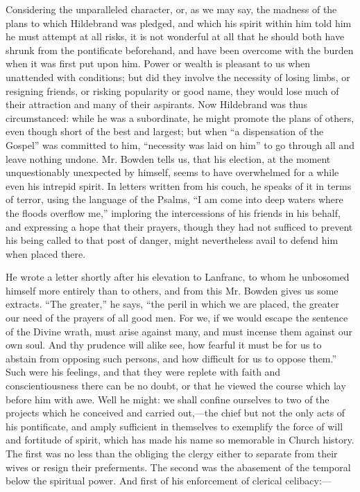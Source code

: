 Considering the unparalleled character, or, as we
may say, the madness of the plans to which Hildebrand was pledged, and
which his spirit within him told him he must attempt at all risks, it
is not wonderful at all that he should both have shrunk from the
pontificate beforehand, and have been overcome with the burden when it
was first put upon him. Power or wealth is pleasant to us when
unattended with conditions; but did they involve the necessity of
losing limbs, or resigning friends, or risking popularity or good
name, they would lose much of their attraction and many of their
aspirants. Now Hildebrand was thus circumstanced: while he was a
subordinate, he might promote the plans of others, even though short
of the best and largest; but when ``a dispensation of the Gospel'' was
committed to him, ``necessity was laid on him'' to go through all and
leave nothing undone. Mr. Bowden tells us, that his election, at
the moment unquestionably unexpected by himself, seems to have
overwhelmed for a while even his intrepid spirit. In letters written
from his couch, he speaks of it in terms of terror, using the language
of the Psalms, ``I am come into deep waters where the floods overflow
me,'' imploring the intercessions of his friends in his behalf, and
expressing a hope that their prayers, though they had not sufficed to
prevent his being called to that post of danger, might nevertheless
avail to defend him when placed there.

He wrote a letter shortly after his elevation to
Lanfranc, to whom he unbosomed himself more entirely than to others,
and from this Mr. Bowden gives us some extracts. ``The greater,'' he
says, ``the peril in which we are placed, the greater our need of the
prayers of all good men. For we, if we would escape the sentence of
the Divine wrath, must arise against many, and must incense them
against our own soul. And thy prudence will alike see, how fearful it
must be for us to abstain from opposing such persons, and how
difficult for us to oppose them.'' Such were his feelings, and that
they were replete with faith and conscientiousness there can be no
doubt, or that he viewed the course which lay before him with awe.
Well he might: we shall confine ourselves to two of the projects which
he conceived and carried out,—the chief but not the only acts of his
pontificate, and amply sufficient in themselves to exemplify the force
of will and fortitude of spirit, which has made his name so memorable
in Church history. The first was no less than the obliging the clergy
either to separate from their wives or resign their preferments. The
second was the abasement of the temporal below the spiritual power.
And first of his enforcement of clerical celibacy:—

